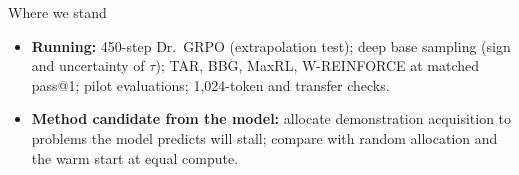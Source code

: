 \documentclass[aspectratio=169,11pt]{beamer}
\begin{document}
\begin{frame}{Where we stand}
\small
{}
\vspace{6pt}
\begin{itemize}
\item \textbf{Running:} 450-step Dr.\ GRPO (extrapolation test); deep base sampling (sign and uncertainty of $\tau$); TAR, BBG, MaxRL, W-REINFORCE at matched pass@1; pilot evaluations; 1,024-token and transfer checks.
\item \textbf{Method candidate from the model:} allocate demonstration acquisition to problems the model predicts will stall; compare with random allocation and the warm start at equal compute.
\end{itemize}
\end{frame}
\end{document}

